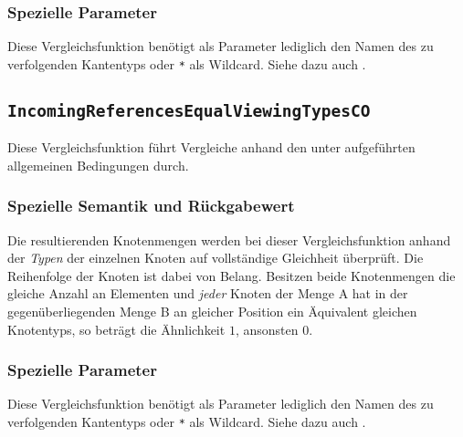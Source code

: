 \subsubsection*{Spezielle Parameter}
Diese Vergleichsfunktion benötigt als Parameter lediglich den Namen des zu verfolgenden Kantentyps oder \texttt{*} als Wildcard. Siehe dazu auch .


%
%
\subsection{\texttt{IncomingReferencesEqualViewingTypesCO}}
Diese Vergleichsfunktion führt Vergleiche anhand den unter\mylinebreak{} aufgeführten allgemeinen Bedingungen durch.

\subsubsection*{Spezielle Semantik und Rückgabewert}
Die resultierenden Knotenmengen werden bei dieser Vergleichsfunktion anhand der \emph{Typen} der einzelnen Knoten auf vollständige Gleichheit überprüft. Die Reihenfolge der Knoten ist dabei von Belang. Besitzen beide Knotenmengen die gleiche Anzahl an Elementen und \emph{jeder} Knoten der Menge A hat in der gegenüberliegenden Menge B an gleicher Position ein Äquivalent gleichen Knotentyps, so beträgt die Ähnlichkeit $1$, ansonsten $0$.

\subsubsection*{Spezielle Parameter}
Diese Vergleichsfunktion benötigt als Parameter lediglich den Namen des zu verfolgenden Kantentyps oder \texttt{*} als Wildcard. Siehe dazu auch .
